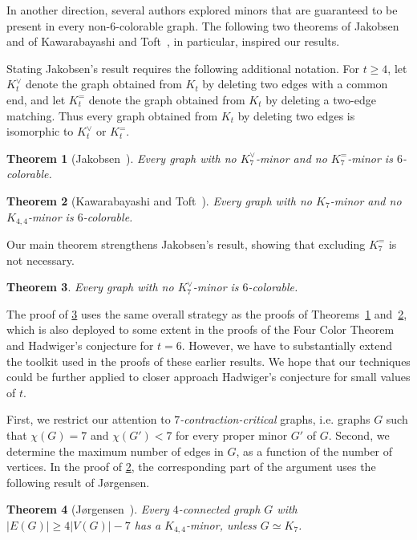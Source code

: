 \documentclass[reqno,final,12pt]{amsart}
\newtheorem{thm}{Theorem}
\begin{document}
	In another direction, several authors explored minors that are guaranteed to be present in every non-$6$-colorable graph. The following two theorems of Jakobsen~\cite{Jakobsen1971} and of Kawarabayashi and Toft~\cite{KT2005}, in particular, inspired our results. 
	
	Stating Jakobsen's result requires the following additional notation. For $t \geq 4$, let $K^{\vee}_t$ denote the graph obtained from $K_t$ by deleting two edges with a common end, and let $K^{=}_t$  denote the graph obtained from $K_t$ by deleting a two-edge matching. Thus every graph obtained from $K_t$ by deleting two edges is isomorphic to $K^{\vee}_t$ or $K^{=}_t$.
	
		\begin{thm}[Jakobsen{~\cite{Jakobsen1971}}]\label{t:Jakobsen}
		Every  graph with no $K_7^{\vee}$-minor and no $K^{=}_7$-minor is $6$-colorable.
	\end{thm}
	
	\begin{thm}[Kawarabayashi and Toft{~\cite{KT2005}}]\label{t:KTmain}
		Every  graph with no $K_7$-minor and no $K_{4,4}$-minor is $6$-colorable.
	\end{thm}
	
	Our main theorem strengthens Jakobsen's result, showing that excluding $K^{=}_7$ is not necessary.
	 
	\begin{thm}\label{t:main}
		Every  graph with no $K_7^{\vee}$-minor is $6$-colorable.
	\end{thm}
	
	
	The proof of \cref{t:main} uses the same overall strategy as the proofs of Theorems~\ref{t:Jakobsen} and~\ref{t:KTmain}, which is also deployed to some extent in the proofs of the Four Color Theorem and Hadwiger's conjecture for $t=6$. However,  we have to substantially extend the toolkit used in the proofs of these earlier results. We hope that our techniques could be further applied to closer approach Hadwiger's conjecture for small values of $t$. 
	
	First, we restrict our attention to \emph{$7$-contraction-critical} graphs, i.e. graphs $G$ such that $\chi(G)=7$ and  $\chi(G') < 7$ for every proper minor $G'$ of $G$.  Second,  we determine the maximum number of edges in $G$, as a function of the number of vertices. 
	In the proof of \cref{t:KTmain}, the corresponding part of the argument uses the following result of J{\o}rgensen.
	
	\begin{thm}[J{\o}rgensen~\cite{Jorgensen1994}]\label{t:Jorgensen}
		Every $4$-connected graph $G$ with $|E(G)| \geq 4|V(G)| - 7$ has a $K_{4,4}$-minor, unless $G \simeq K_7$.
	\end{thm}
	
\end{document}
